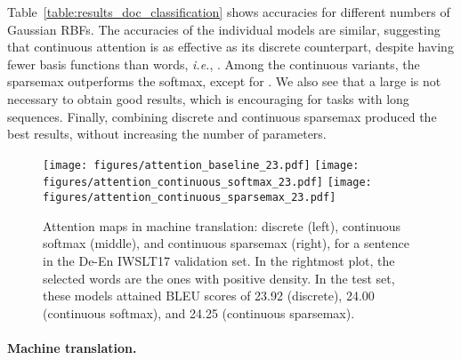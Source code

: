 \documentclass{article}
\begin{document}
\begin{table}[t]
\begin{scriptsize}
\begin{center}
\begin{comment}
        Discrete sparsemax	 		& 90.58		& 90.58		& 90.58   	\\
       \midrule
        Continuous softmax			& 90.20		& 90.68		& 90.52    	\\
        Continuous sparsemax	 	& 90.52		& 89.63		& 90.90   	\\
        Disc. + Cont. softmax		& 90.98		& 90.69		& 89.62   	\\
        Disc. + Cont. sparsemax	 	& \bf 91.10		& \bf 91.18		& \bf 90.98    	\\
        \bottomrule
    \end{tabular}
\end{comment}
\end{center}
    \end{scriptsize}
\end{table}

Table~\ref{table:results_doc_classification} 
shows accuracies for different numbers  of Gaussian RBFs. The accuracies of the individual models are similar, suggesting that continuous attention is as effective as its discrete counterpart, despite having fewer basis functions than words, \textit{i.e.}, . Among the continuous variants, the sparsemax outperforms the softmax, except for . We also see that a large  is not necessary to obtain good results, which is encouraging for tasks with long sequences. Finally, combining discrete and continuous sparsemax produced the best results, without increasing the number of parameters.




\begin{figure*}[t]
\centering
\texttt{[image: figures/attention\_baseline\_23.pdf]}
\texttt{[image: figures/attention\_continuous\_softmax\_23.pdf]}
\texttt{[image: figures/attention\_continuous\_sparsemax\_23.pdf]}
\caption{\label{fig:attention_maps}Attention maps in machine translation: discrete (left), continuous softmax (middle), and continuous sparsemax (right), for a sentence in the De-En IWSLT17 validation set. In the rightmost plot, the selected words are the ones with positive density. In the test set, these models attained BLEU scores of 23.92 (discrete), 24.00 (continuous softmax), and 24.25 (continuous sparsemax).}
\end{figure*}


\paragraph{Machine translation.} 
\end{document}
